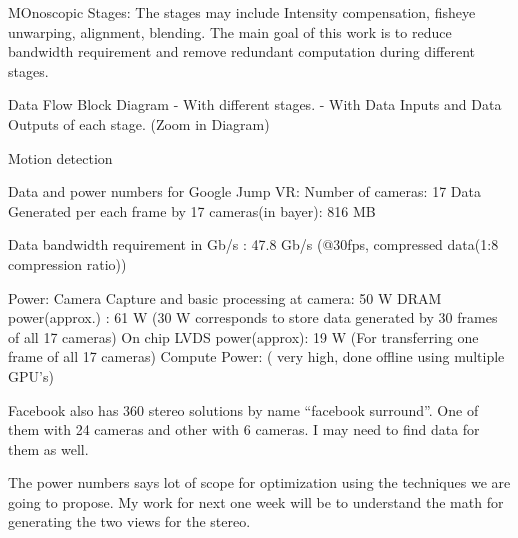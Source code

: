 MOnoscopic Stages:
The stages may include Intensity compensation, fisheye unwarping, alignment, blending. The main goal of this work is to reduce bandwidth requirement and remove redundant computation during different stages. 

Data Flow \newline
Block Diagram
- With different stages.
- With Data Inputs and Data Outputs of each stage. (Zoom in Diagram)



Motion detection 



Data and power numbers for Google Jump VR:
Number of cameras: 17
Data Generated per each frame by 17 cameras(in bayer): 816 MB

Data bandwidth requirement in Gb/s : 47.8 Gb/s
(@30fps, compressed data(1:8 compression ratio))

Power:
Camera Capture and basic processing at camera:  50 W
DRAM power(approx.) : 61 W 
(30 W corresponds to store data generated by 30 frames of all 17 cameras)
On chip LVDS power(approx): 19 W
(For transferring one frame of all 17 cameras)
Compute Power: ( very high, done offline using multiple GPU’s)

Facebook also has 360 stereo solutions by name “facebook surround”. One of them with 24 cameras and other with 6 cameras. I may need to find data for them as well. 

The power numbers says lot of scope for optimization using the techniques we are going to propose. My work for next one week will be to understand the math for generating the two views for the stereo. 
